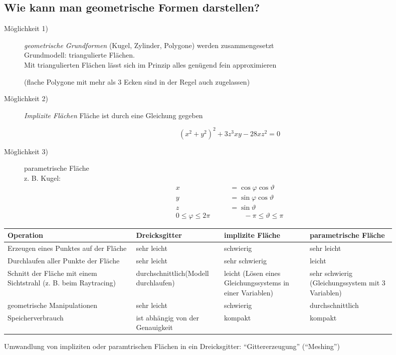 \subsection{Wie kann man geometrische Formen darstellen?}
\begin{description}
 \item[Möglichkeit 1)] \emph{geometrische Grundformen} (Kugel, Zylinder, Polygone) werden zusammengesetzt\\[1em]
	Grundmodell: triangulierte Flächen.\\[1em]
	Mit triangulierten Flächen lässt sich im Prinzip alles genügend fein approximieren
	\begin{center}
	\end{center}
	(flache Polygone mit mehr als 3 Ecken sind in der Regel auch zugelassen)
	\begin{center}
	\end{center}
 \item[Möglichkeit 2)] \emph{Implizite Flächen} Fläche ist durch eine Gleichung gegeben
	\begin{center}
	\end{center}
	\[(x^2 + y^2)^2 + 3z^3xy - 28xz^2 = 0\]
 \item[Möglichkeit 3)] parametrische Fläche\\
	z. B. Kugel:
	\begin{align*}
	 x &= \cos \varphi \cos \vartheta\\
	 y &= \sin \varphi \cos \vartheta\\
	 z &= \sin \vartheta\\
	 0 \le \varphi \le 2 \pi \qquad & \qquad -\pi \le \vartheta \le \pi
	\end{align*}
\end{description}
\begin{center}
 \begin{tabular}{p{0.3\linewidth}|p{0.2\linewidth}|p{0.2\linewidth}|p{0.2\linewidth}}
  \textbf{Operation} & \textbf{Dreicksgitter} & \textbf{implizite Fläche} & \textbf{parametrische Fläche}\\
  \hline\hline
  Erzeugen eines Punktes auf der Fläche &
	sehr leicht & schwierig & sehr leicht \\\hline
  Durchlaufen aller Punkte der Fläche &
	sehr leicht & sehr schwierig & leicht \\\hline
  Schnitt der Fläche mit einem Sichtstrahl\newline
  (z. B. beim Raytracing)
	 & durchschnittlich\footnotemark[1] (Modell durchlaufen)
	 & leicht (Lösen eines Gleichungssystems in einer Variablen)
	 & sehr schwierig (Gleichungssystem mit 3 Variablen)\\\hline
  geometrische Manipulationen &
	sehr leicht & schwierig & durchschnittlich\\\hline
  Speicherverbrauch & ist abhängig von der Genauigkeit & kompakt & kompakt
 \end{tabular}
\end{center}
Umwandlung von impliziten oder paramtrischen Flächen in ein Dreicksgitter: "`Gittererzeugung"' ("`Meshing"')


